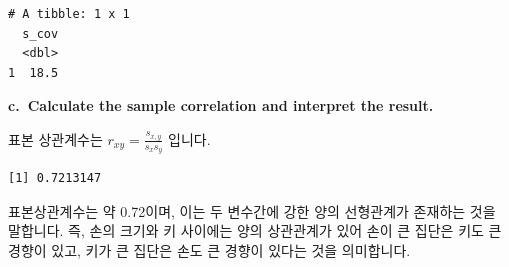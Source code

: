 \documentclass[
  letterpaper,
  DIV=11,
  numbers=noendperiod]{scrreprt}
\newenvironment{Shaded}{\begin{snugshade}}{\end{snugshade}}
\newcommand{\FunctionTok}[1]{\textcolor[rgb]{0.28,0.35,0.67}{#1}}
\newcommand{\NormalTok}[1]{\textcolor[rgb]{0.00,0.23,0.31}{#1}}
\newcommand{\OtherTok}[1]{\textcolor[rgb]{0.00,0.23,0.31}{#1}}
\newcommand{\SpecialCharTok}[1]{\textcolor[rgb]{0.37,0.37,0.37}{#1}}
\begin{document}
\begin{verbatim}
# A tibble: 1 x 1
  s_cov
  <dbl>
1  18.5
\end{verbatim}

\textbf{c.~Calculate the sample correlation and interpret the result.}

표본 상관계수는 \(r_{xy}=\frac{s_{x,y}}{s_xs_y}\) 입니다.

\begin{Shaded}
\end{Shaded}

\begin{verbatim}
[1] 0.7213147
\end{verbatim}

표본상관계수는 약 0.72이며, 이는 두 변수간에 강한 양의 선형관계가
존재하는 것을 말합니다. 즉, 손의 크기와 키 사이에는 양의 상관관계가 있어
손이 큰 집단은 키도 큰 경향이 있고, 키가 큰 집단은 손도 큰 경향이 있다는
것을 의미합니다.
\end{document}
